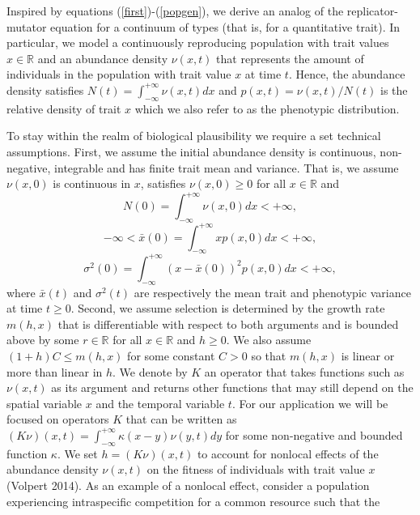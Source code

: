 \documentclass[]{article}
\begin{document}
Inspired by equations (\ref{first})-(\ref{popgen}), we derive an analog
of the replicator-mutator equation for a continuum of types (that is,
for a quantitative trait). In particular, we model a continuously
reproducing population with trait values \(x\in\mathbb{R}\) and an
abundance density \(\nu(x,t)\) that represents the amount of individuals
in the population with trait value \(x\) at time \(t\). Hence, the
abundance density satisfies \(N(t)=\int_{-\infty}^{+\infty}\nu(x,t)dx\)
and \(p(x,t)=\nu(x,t)/N(t)\) is the relative density of trait \(x\)
which we also refer to as the phenotypic distribution.

To stay within the realm of biological plausibility we require a set
technical assumptions. First, we assume the initial abundance density is
continuous, non-negative, integrable and has finite trait mean and
variance. That is, we assume \(\nu(x,0)\) is continuous in \(x\),
satisfies \(\nu(x,0)\geq0\) for all \(x\in\mathbb{R}\) and
\begin{equation}
N(0)=\int_{-\infty}^{+\infty}\nu(x,0)dx<+\infty,
\end{equation} \begin{equation}
-\infty<\bar x(0)=\int_{-\infty}^{+\infty}xp(x,0)dx<+\infty,
\end{equation} \begin{equation}
\sigma^2(0)=\int_{-\infty}^{+\infty}(x-\bar x(0))^2p(x,0)dx<+\infty,
\end{equation} where \(\bar x(t)\) and \(\sigma^2(t)\) are respectively
the mean trait and phenotypic variance at time \(t\geq0\). Second, we
assume selection is determined by the growth rate \(m(h,x)\) that is
differentiable with respect to both arguments and is bounded above by
some \(r\in\mathbb{R}\) for all \(x\in\mathbb{R}\) and \(h\geq0\). We
also assume \((1+h)C\leq m(h,x)\) for some constant \(C>0\) so that
\(m(h,x)\) is linear or more than linear in \(h\). We denote by \(K\) an
operator that takes functions such as \(\nu(x,t)\) as its argument and
returns other functions that may still depend on the spatial variable
\(x\) and the temporal variable \(t\). For our application we will be
focused on operators \(K\) that can be written as
\((K\nu)(x,t)=\int_{-\infty}^{+\infty}\kappa(x-y)\nu(y,t)dy\) for some
non-negative and bounded function \(\kappa\). We set \(h=(K\nu)(x,t)\)
to account for nonlocal effects of the abundance density \(\nu(x,t)\) on
the fitness of individuals with trait value \(x\) (Volpert 2014). As an
example of a nonlocal effect, consider a population experiencing
intraspecific competition for a common resource such that the
\end{document}
